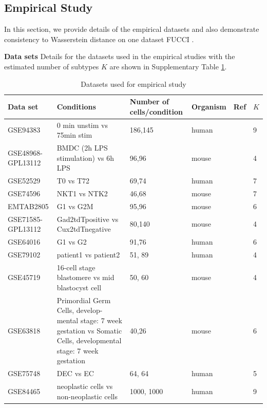 \documentclass[aoas,preprint]{imsart}
\begin{document}
\clearpage

\subsection{Empirical Study}

In this section, we provide details of the empirical datasets and also demonstrate consistency to Wasserstein distance on one dataset FUCCI \citep{oscope}.


\noindent
{\bf Data sets} Details for the datasets used in the empirical studies with the estimated number of subtypes $K$ are shown in Supplementary Table \ref{table:1}.


\begin{table}[h!]
\small
\centering
\begin{tabular}{ |p{2cm}|p{5cm}|p{2cm}|p{2cm}|p{2cm}|p{1cm}|}
\hline
 Data set & Conditions & Number of cells/condition & Organism  & Ref & $K$\\ \hline \hline
GSE94383 & 0 min unstim vs 75min stim & 186,145 & human & \citep{Lane} & 9\\ \hline
GSE48968-GPL13112 & BMDC (2h LPS stimulation) vs 6h LPS & 96,96 & mouse & \citep{Shalek} & 4\\ \hline
GSE52529 & T0 vs T72 & 69,74 & human & \citep{Trapnell} & 7\\ \hline
GSE74596 & NKT1 vs NTK2 & 46,68 & mouse & \citep{Engel} & 7\\ \hline
EMTAB2805 & G1 vs G2M & 95,96 & mouse & \citep{EMTAB} & 6\\ \hline
GSE71585-GPL13112 &Gad2tdTpositive vs Cux2tdTnegative  & 80,140 & mouse & \citep{Tasic} & 4\\ \hline
GSE64016 & G1 vs G2 & 91,76 & human & \citep{oscope} & 6\\ \hline
GSE79102 & patient1 vs patient2 & 51, 89 & human & \cite{sc3} & 4\\ \hline
GSE45719 & 16-cell stage blastomere vs mid blastocyst cell & 50, 60 & mouse & \citep{Deng193} & 4\\ \hline
GSE63818 & Primordial Germ Cells, develop- mental stage: 7 week gestation vs Somatic Cells, developmental stage: 7 week gestation & 40,26 & mouse & \citep{Guo} & 6\\ \hline
GSE75748 & DEC vs EC & 64, 64 & human & \citep{chu} & 5\\ \hline
GSE84465 & neoplastic cells vs non-neoplastic cells & 1000, 1000 & human & \citep{Darmanis} & 9\\ \hline
\end{tabular}
\caption{Datasets used for empirical study}
\label{table:1}
\end{table}
\end{document}
